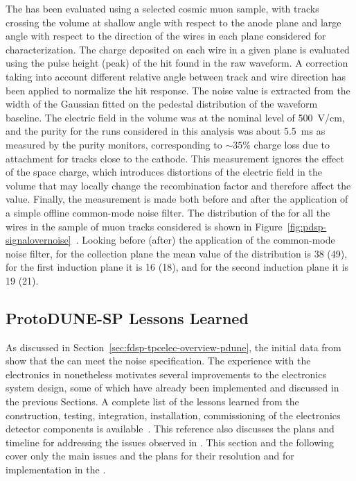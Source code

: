 The  has been evaluated using a selected cosmic muon sample, with tracks
crossing the  volume at shallow angle with respect to the anode plane and
large angle with respect to the direction of the wires in each plane considered
for  characterization. The charge deposited on each wire in a given plane is evaluated
using the pulse height (peak) of the hit found in the raw waveform.
A correction taking into account different relative angle between track and wire
direction has been applied to normalize the hit response. The noise value is extracted
from the width of the Gaussian fitted on the pedestal distribution of the waveform baseline.
The electric field in the  volume was at the nominal level of \SI{500}{V/cm},
and the  purity for the runs considered in this analysis was about \SI{5.5}{ms}
as measured by the purity monitors, corresponding to $\sim35$\% charge loss due to
attachment for tracks close to the cathode. This measurement ignores the effect of the
space charge, which introduces distortions of the electric field in the  volume that
may locally change the recombination factor and therefore affect the  value. Finally,
the measurement is made both before and after the application of a simple offline common-mode noise filter.
The distribution of the  for all the wires in the sample of muon tracks considered is
shown in Figure~\ref{fig:pdsp-signalovernoise}~\cite{pend_PDSP_PerfPaper}. Looking before (after)
the application of the common-mode noise filter, for the collection plane the mean value of the
 distribution is 38 (49), for the first induction plane it is 16 (18), and for the
second induction plane it is 19 (21).

\subsection{ProtoDUNE-SP Lessons Learned}
\label{sec:fdsp-tpcelec-overview-lessons}

As discussed in Section~\ref{sec:fdsp-tpcelec-overview-pdune}, the initial 
data from  show that the  can meet the noise specification. 
The experience with the  electronics in  nonetheless motivates 
several improvements to the  electronics system design, some of which
have already been implemented and discussed in the previous Sections.
A complete list of the lessons learned from the construction, testing, integration,
installation, commissioning of the  electronics detector components
is available~\cite{bib:docdb12367}. This reference also discusses
the plans and timeline for addressing the issues observed in . 
This  section and the following cover only the main issues 
and the plans for their resolution and for implementation in the . 

